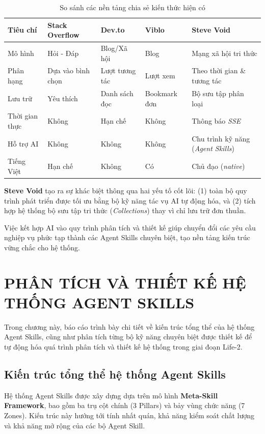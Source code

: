\documentclass[13pt,a4paper,oneside]{extreport}
\numberwithin{equation}{chapter}
\numberwithin{figure}{chapter}
\numberwithin{table}{chapter}
\begin{document}
\begin{table}[H]
\centering
\caption{So sánh các nền tảng chia sẻ kiến thức hiện có}
\begin{tabular}{|p{2.5cm}|p{2.5cm}|p{2.5cm}|p{2.5cm}|p{2.5cm}|}
\hline
\textbf{Tiêu chí} & \textbf{Stack Overflow} & \textbf{Dev.to} & \textbf{Viblo} & \textbf{Steve Void} \\
\hline
Mô hình & Hỏi - Đáp & Blog/Xã hội & Blog & Mạng xã hội tri thức \\
\hline
Phân hạng & Dựa vào bình chọn & Lượt tương tác & Lượt xem & Theo thời gian \& tương tác \\
\hline
Lưu trữ & Yêu thích & Danh sách đọc & Bookmark đơn & Bộ sưu tập phân loại \\
\hline
Thời gian thực & Không & Hạn chế & Không & Thông báo \textit{SSE} \\
\hline
Hỗ trợ AI & Không & Không & Không & Chu trình kỹ năng (\textit{Agent Skills}) \\
\hline
Tiếng Việt & Hạn chế & Không & Có & Chủ đạo (\textit{native}) \\
\hline
\end{tabular}
\end{table}

\textbf{Steve Void} tạo ra sự khác biệt thông qua hai yếu tố cốt lõi: (1) toàn bộ quy trình phát triển được tối ưu bằng bộ kỹ năng tác vụ AI tự động hóa, và (2) tích hợp hệ thống bộ sưu tập tri thức (\textit{Collections}) thay vì chỉ lưu trữ đơn thuần.

Việc kết hợp AI vào quy trình phân tích và thiết kế giúp chuyển đổi các yêu cầu nghiệp vụ phức tạp thành các Agent Skills chuyên biệt, tạo nền tảng kiến trúc vững chắc cho hệ thống.

\chapter{PHÂN TÍCH VÀ THIẾT KẾ HỆ THỐNG AGENT SKILLS}

Trong chương này, báo cáo trình bày chi tiết về kiến trúc tổng thể của hệ thống Agent Skills, cũng như phân tích từng bộ kỹ năng chuyên biệt được thiết kế để tự động hóa quá trình phân tích và thiết kế hệ thống trong giai đoạn Life-2.

\section{Kiến trúc tổng thể hệ thống Agent Skills}

Hệ thống Agent Skills được xây dựng dựa trên mô hình \textbf{Meta-Skill Framework}, bao gồm ba trụ cột chính (3 Pillars) và bảy vùng chức năng (7 Zones). Kiến trúc này hướng tới tính nhất quán, khả năng kiểm soát chất lượng và khả năng mở rộng của các bộ Agent Skill.
\end{document}
